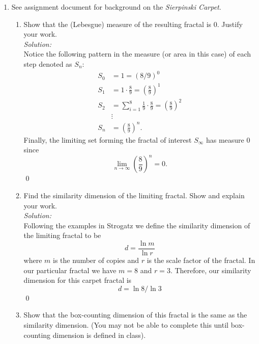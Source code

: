 \documentclass[10pt]{amsart}
\theoremstyle{nonumberplain}
\begin{document}
\begin{enumerate}[label={\bf {\arabic*}:}]
\item See assignment document for background on the \textit{Sierpinski Carpet}.
\begin{enumerate}

\item Show that the (Lebesgue) measure of the resulting fractal is 0.
Justify your work. \\

\textit{Solution:} \\
Notice the following pattern in the measure (or area in this case) of each step denoted as $S_n$:
\begin{align*}
S_0 &= 1 = \left( 8/9 \right)^0\\
S_1 &= 1 \cdot \frac 8 9  = \left( \frac 8 9 \right)^1 \\
S_2 &= \sum_{i=1}^8\frac 1 9 \cdot \frac 8 9  = \left( \frac 8 9 \right)^2 \\
&\vdots \\
S_n &= \left( \frac 8 9 \right)^n.
\end{align*}
Finally, the limiting set forming the fractal of interest $S_\infty$ has measure 0 since
$$\lim_{n\rightarrow\infty} \left( \frac 8 9 \right)^n = 0.$$
\qed \\

\item Find the similarity dimension of the limiting fractal. Show and explain your work. \\

\textit{Solution:} \\
Following the examples in Strogatz we define the similarity dimension of the limiting fractal to be
\begin{equation}
d = \frac {\ln m}{\ln r}
\label{eq:sim_dim}
\end{equation}
where $m$ is the number of copies and $r$ is the scale factor of the fractal.
In our particular fractal we have $m = 8$ and $r = 3$.
Therefore, our similarity dimension for this carpet fractal is 
$$
d = \ln 8/\ln 3
$$
\qed \\

\item Show that the box-counting dimension of this fractal is the same as the similarity dimension. (You may not be able to complete this until box-counting dimension is defined in class). \\


\end{enumerate}
\end{enumerate}
\end{document}
